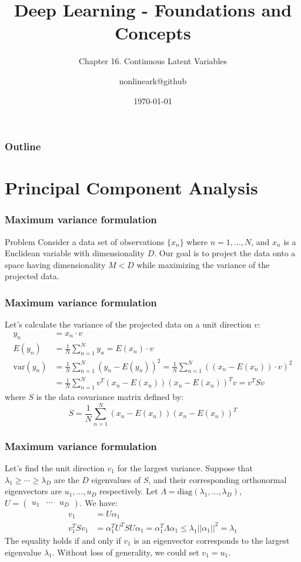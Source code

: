 \documentclass{beamer}
\title{Deep Learning - Foundations and Concepts}
\subtitle{Chapter 16. Continuous Latent Variables}
\author{nonlineark@github}
\date{\today}
\begin{document}
\begin{frame}
    \titlepage
\end{frame}

\begin{frame}
    \frametitle{Outline}
    \tableofcontents
\end{frame}

\section{Principal Component Analysis}

\begin{frame}
    \frametitle{Maximum variance formulation}
    \begin{block}{Problem}
        Consider a data set of observations $\{x_{n}\}$ where $n=1,\hdots,N$, and $x_{n}$ is a Euclidean variable with dimensionality $D$. Our goal is to project the data onto a space having dimensionality $M<D$ while maximizing the variance of the projected data.
    \end{block}
\end{frame}

\begin{frame}
    \frametitle{Maximum variance formulation}
    Let's calculate the variance of the projected data on a unit direction $v$:
    \begin{align*}
        y_{n}&=x_{n}\cdot{}v \\
        E(y_{n})&=\frac{1}{N}\sum_{n=1}^{N}y_{n}=E(x_{n})\cdot{}v \\
        \mathrm{var}(y_{n})&=\frac{1}{N}\sum_{n=1}^{N}(y_{n}-E(y_{n}))^{2}=\frac{1}{N}\sum_{n=1}^{N}((x_{n}-E(x_{n}))\cdot{}v)^{2} \\
        &=\frac{1}{N}\sum_{n=1}^{N}v^{T}(x_{n}-E(x_{n}))(x_{n}-E(x_{n}))^{T}v=v^{T}Sv
    \end{align*}
    where $S$ is the data covariance matrix defined by:
    \begin{equation*}
        S=\frac{1}{N}\sum_{n=1}^{N}(x_{n}-E(x_{n}))(x_{n}-E(x_{n}))^{T}
    \end{equation*}
\end{frame}

\begin{frame}
    \frametitle{Maximum variance formulation}
    Let's find the unit direction $v_{1}$ for the largest variance. Suppose that $\lambda_{1}\ge\cdots\ge\lambda_{D}$ are the $D$ eigenvalues of $S$, and their corresponding orthonormal eigenvectors are $u_{1},\hdots,u_{D}$ respectively. Let $\Lambda=\mathrm{diag}(\lambda_{1},\hdots,\lambda_{D})$, $U=\begin{pmatrix}
        u_{1}&\cdots&u_{D}
    \end{pmatrix}$. We have:
    \begin{align*}
        v_{1}&=U\alpha_{1} \\
        v_{1}^{T}Sv_{1}&=\alpha_{1}^{T}U^{T}SU\alpha_{1}=\alpha_{1}^{T}\Lambda\alpha_{1}\le\lambda_{1}||\alpha_{1}||^{2}=\lambda_{1}
    \end{align*}
    The equality holds if and only if $v_{1}$ is an eigenvector corresponds to the largest eigenvalue $\lambda_{1}$. Without loss of generality, we could set $v_{1}=u_{1}$.
\end{frame}
\end{document}

